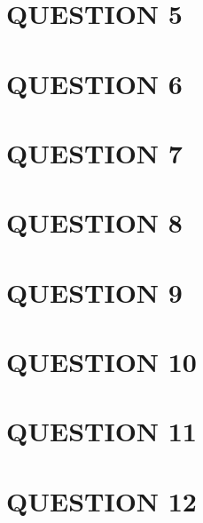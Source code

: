 \documentclass[a4paper]{article}
\begin{document}
\section{QUESTION 5}
\section{QUESTION 6}
\section{QUESTION 7}
\section{QUESTION 8}
\section{QUESTION 9}


\section{QUESTION 10}
\section{QUESTION 11}
\section{QUESTION 12}
\end{document}
